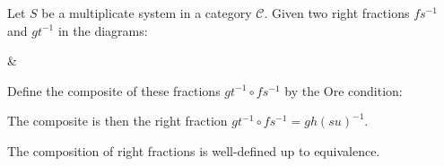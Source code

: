     \begin{definition}
        Let $S$ be a multiplicate system in a category $\mathcal{C}$. Given two right fractions $fs^{-1}$ and $gt^{-1}$ in the diagrams:
        \begin{center}
            \&
        \end{center}
        Define the composite of these fractions $gt^{-1}\circ fs^{-1}$ by the Ore condition:
        \begin{center}
        \end{center}
        The composite is then the right fraction $gt^{-1}\circ fs^{-1} = gh(su)^{-1}$.
    \end{definition}

    \begin{prop}
        The composition of right fractions is well-defined up to equivalence.
    \end{prop}

